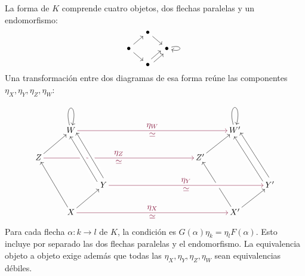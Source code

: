 La forma de $K$ comprende cuatro objetos, dos flechas paralelas y un endomorfismo:
\[
\begin{tikzcd}[column sep=small,row sep=small,cramped]
& \bullet \arrow[dr] &\\
\bullet \arrow[ur] \arrow[dr] & & \bullet \arrow[loop right]\\
& \bullet \arrow[ur,shift left=1] \arrow[ur,shift right=1] &
\end{tikzcd}
\]
Una transformación entre dos diagramas de esa forma reúne las componentes $\eta_X,\eta_Y,\eta_Z,\eta_W$:
\[
\begin{tikzcd}[column sep=9mm,row sep=7.5mm,
  cells={nodes={inner sep=2pt}},
  every label/.append style={font=\normalsize}]
& W \arrow[loop above,looseness=10,min distance=10mm] & & & & & & W' \arrow[loop above,looseness=10,min distance=10mm] &\\
Z \arrow[ur] & & & & & & Z' \arrow[ur] & &\\
& & Y
& & & & & & Y' \arrow[uul,shift left=1.8,crossing over]
           \arrow[uul,shift right=1.8,crossing over]\\
& X \arrow[uul] \arrow[ur] & & & & & & X' \arrow[uul] \arrow[ur] &
\arrow[from=1-2,to=1-8,rojoDiagramaCIMAT,"\eta_W"{pos=.5},"\simeq"'{pos=.5}]
\arrow[from=2-1,to=2-7,rojoDiagramaCIMAT,"\eta_Z"{pos=.5},"\simeq"'{pos=.5}]
\arrow[from=3-3,to=3-9,rojoDiagramaCIMAT,crossing over,"\eta_Y"{pos=.5},"\simeq"'{pos=.5}]
\arrow[from=4-2,to=4-8,rojoDiagramaCIMAT,"\eta_X"{pos=.5},"\simeq"'{pos=.5}]
\arrow[from=3-3,to=1-2,shift left=1.8,crossing over]
\arrow[from=3-3,to=1-2,shift right=1.8,crossing over]
\end{tikzcd}
\]
Para cada flecha $\alpha\colon k\to l$ de $K$, la condición es $G(\alpha)\eta_k=\eta_lF(\alpha)$. Esto incluye por separado las dos flechas paralelas y el endomorfismo. La equivalencia objeto a objeto exige además que todas las $\eta_X,\eta_Y,\eta_Z,\eta_W$ sean equivalencias débiles.

